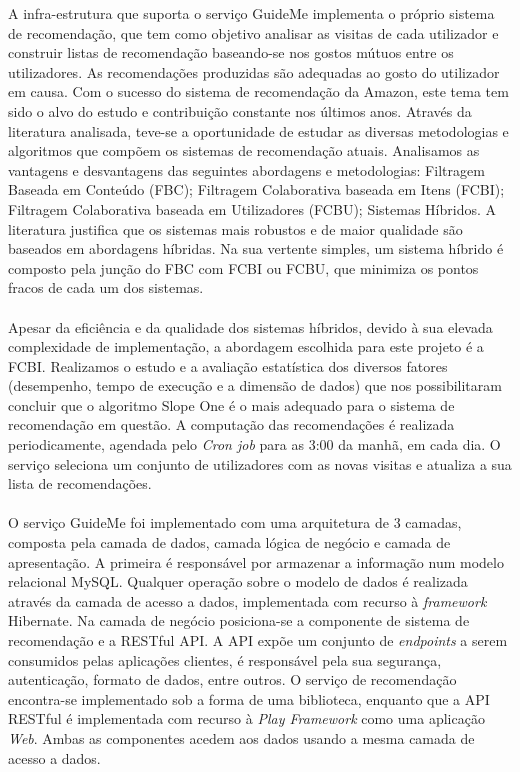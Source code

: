 A infra-estrutura que suporta o serviço GuideMe implementa o próprio sistema de recomendação, que tem como objetivo analisar as visitas de cada utilizador e construir listas de recomendação baseando-se nos gostos mútuos entre os utilizadores. As recomendações produzidas são adequadas ao gosto do utilizador em causa. Com o sucesso do sistema de recomendação da Amazon, este tema tem sido o alvo do estudo e contribuição constante nos últimos anos. Através da literatura analisada, teve-se a oportunidade de estudar as diversas metodologias e algoritmos que compõem os sistemas de recomendação atuais. Analisamos as vantagens e desvantagens das seguintes abordagens e metodologias: Filtragem Baseada em Conteúdo (FBC); Filtragem Colaborativa baseada em Itens (FCBI); Filtragem Colaborativa baseada em Utilizadores (FCBU); Sistemas Híbridos. A literatura justifica que os sistemas mais robustos e de maior qualidade são baseados em abordagens híbridas. Na sua vertente simples, um sistema híbrido é composto pela junção do FBC com FCBI ou FCBU, que minimiza os pontos fracos de cada um dos sistemas.\\
\\
Apesar da eficiência e da qualidade dos sistemas híbridos, devido à sua elevada complexidade de implementação, a abordagem escolhida para este projeto é a FCBI. Realizamos o estudo e a avaliação estatística dos diversos fatores (desempenho, tempo de execução e a dimensão de dados) que nos possibilitaram concluir que o algoritmo Slope One é o mais adequado para o sistema de recomendação em questão. A computação das recomendações é realizada periodicamente, agendada pelo \textit{Cron job} para as 3:00 da manhã, em cada dia. O serviço seleciona um conjunto de utilizadores com as novas visitas e atualiza a sua lista de recomendações.\\
\\
O serviço GuideMe foi implementado com uma arquitetura de 3 camadas, composta pela camada de dados, camada lógica de negócio e camada de apresentação. A primeira é responsável por armazenar a informação num modelo relacional MySQL. Qualquer operação sobre o modelo de dados é realizada através da camada de acesso a dados, implementada com recurso à \textit{framework} Hibernate. Na camada de negócio posiciona-se a componente de sistema de recomendação e a RESTful API. A API expõe um conjunto de \textit{endpoints} a serem consumidos pelas aplicações clientes, é responsável pela sua segurança, autenticação, formato de dados, entre outros. O serviço de recomendação encontra-se implementado sob a forma de uma biblioteca, enquanto que a API RESTful é implementada com recurso à \textit{Play Framework} como uma aplicação \textit{Web}. Ambas as componentes acedem aos dados usando a mesma camada de acesso a dados.\\

